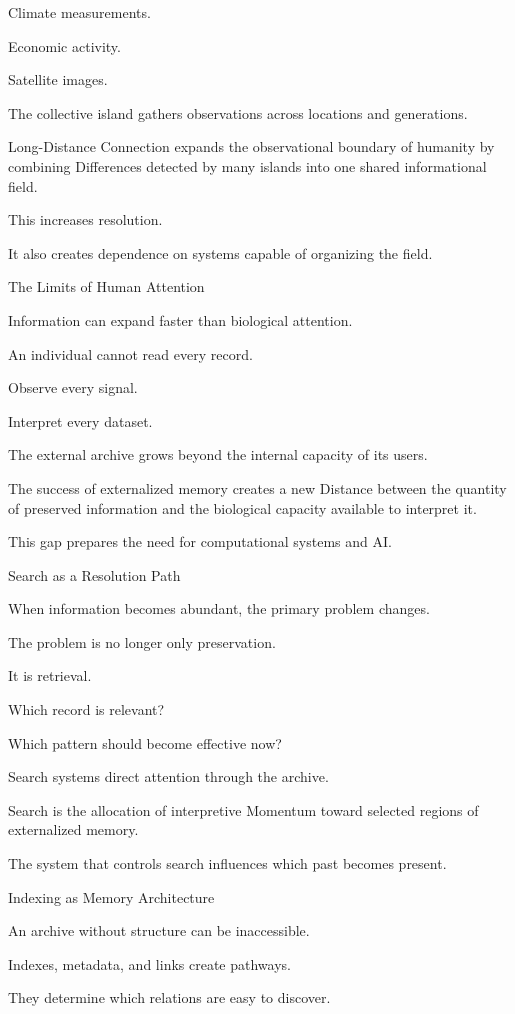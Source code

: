Climate measurements.

Economic activity.

Satellite images.

The collective island gathers observations across locations and generations.

Long-Distance Connection expands the observational boundary of humanity by combining Differences detected by many islands into one shared informational field.

This increases resolution.

It also creates dependence on systems capable of organizing the field.

The Limits of Human Attention

Information can expand faster than biological attention.

An individual cannot read every record.

Observe every signal.

Interpret every dataset.

The external archive grows beyond the internal capacity of its users.

The success of externalized memory creates a new Distance between the quantity of preserved information and the biological capacity available to interpret it.

This gap prepares the need for computational systems and AI.

Search as a Resolution Path

When information becomes abundant, the primary problem changes.

The problem is no longer only preservation.

It is retrieval.

Which record is relevant?

Which pattern should become effective now?

Search systems direct attention through the archive.

Search is the allocation of interpretive Momentum toward selected regions of externalized memory.

The system that controls search influences which past becomes present.

Indexing as Memory Architecture

An archive without structure can be inaccessible.

Indexes, metadata, and links create pathways.

They determine which relations are easy to discover.

